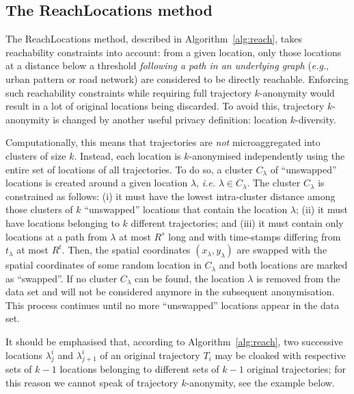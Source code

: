 \subsection{The ReachLocations method}

The ReachLocations method, described in Algorithm~\ref{alg:reach},
takes reachability constraints into account: from a given
location, only those locations at a distance below a threshold
{\em following a path in an underlying graph} ({\em e.g.},
urban pattern or road network) are considered to be directly
reachable. Enforcing such reachability constraints while requiring
full trajectory $k$-anonymity would result in a lot of original locations
being discarded. To avoid this, trajectory $k$-anonymity is
changed by another useful privacy definition: location $k$-diversity.

Computationally, this means that trajectories are {\em not} microaggregated
into clusters of size $k$. Instead,
each location is $k$-anonymised independently using
the entire set of locations of all trajectories. To do so, a
cluster $C_\lambda$ of ``unswapped'' locations is created around a
given location $\lambda$, {\em i.e.}
$\lambda \in C_\lambda$.
The cluster $C_\lambda$ is constrained as follows:
(i) it must have the lowest intra-cluster distance among those clusters
of $k$ ``unswapped'' locations that contain the location $\lambda$;
(ii) it must have locations belonging to $k$ different trajectories; and (iii)
it must contain only locations at a path from $\lambda$
at most $R^s$ long and with time-stamps differing from
$t_\lambda$ at most $R^t$. Then, the spatial coordinates
$(x_\lambda, y_\lambda)$ are swapped with the
spatial coordinates of some random location in $C_\lambda$
and both locations are marked as ``swapped''. If no cluster $C_\lambda$
can be found, the location $\lambda$ is removed from the data set
and will not be considered anymore in the subsequent anonymisation.
This process continues until no more ``unswapped'' locations
appear in the data set.

It should be emphasised that, according to Algorithm~\ref{alg:reach},
two successive locations $\lambda^i_j$
and $\lambda^i_{j+1}$ of
an original trajectory
$T_i$ may be cloaked with respective sets of $k-1$ locations belonging
to different sets of $k-1$ original trajectories; for this reason
we cannot speak of trajectory $k$-anonymity, see the example below.

